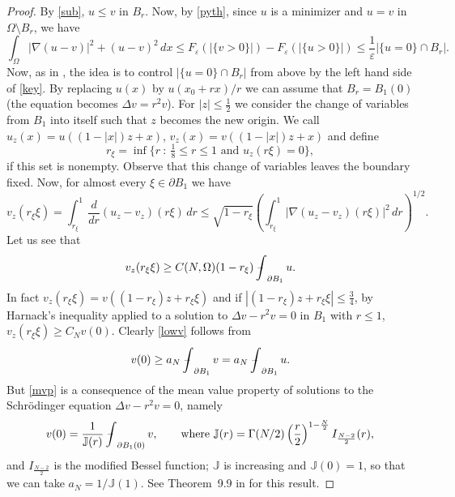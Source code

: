 \documentclass[11pt]{amsart}
\theoremstyle{definition}
\theoremstyle{remark}
\numberwithin{equation}{section}
\newcommand{\avint}{\mathop{\,\rlap{--}\!\!\int}\nolimits}
\begin{document}
\begin{proof}
By \eqref{sub}, $u\le v$ in $B_r$. Now, by \eqref{pyth}, since $u$ is a minimizer and $u=v$ in $\Omega\setminus B_r$, we have
\begin{equation}\label{key}
\int_\Omega|\nabla(u-v)|^2+(u-v)^2\,dx\le F_\varepsilon(|\{v>0\}|)-F_\varepsilon(|\{u>0\}|)\le\frac1\varepsilon|\{u=0\}\cap B_r|.
\end{equation}
Now, as in \cite{AC}, the idea is to control $|\{u=0\}\cap B_r|$ from above by the left hand side of \eqref{key}. By replacing $u(x)$ by $u(x_0+rx)/r$ we can assume that $B_r=B_1(0)$ (the equation becomes $\Delta v=r^2v$). For $|z|\le\frac12$ we consider the change of variables from $B_1$ into itself such that $z$ becomes the new origin. We call $u_z(x)=u((1-|x|)z+x)$, $v_z(x)=v((1-|x|)z+x)$ and define
\[
r_\xi=\inf\{r\ :\ \tfrac18\le r\le1\text{ and }u_z(r\xi)=0\},
\]
if this set is nonempty. Observe that this change of variables leaves the boundary fixed. Now, for almost every $\xi\in\partial B_1$ we have
\begin{equation}\label{fund}
v_z(r_\xi\xi)=\int_{r_\xi}^1\frac{d}{dr}(u_z-v_z)(r\xi)\,dr\le\sqrt{1-r_\xi}\left(\int_{r_\xi}^1|\nabla(u_z-v_z)(r\xi)|^2\,dr\right)^{1/2}.
\end{equation}
Let us see that
\begin{equation}\label{lowv}
v_z(r_\xi\xi)\ge C(N,\Omega)(1-r_\xi)\avint_{\partial B_1}u.
\end{equation}
In fact $v_z(r_\xi\xi)=v((1-r_\xi)z+r_\xi\xi)$ and if $|(1-r_\xi)z+r_\xi\xi|\le\frac34$, by Harnack's inequality applied to a solution to $\Delta v-r^2v=0$ in $B_1$ with $r\le1$, $v_z(r_\xi\xi)\ge C_Nv(0)$. Clearly \eqref{lowv} follows from
\begin{equation}\label{mvp}
v(0)\ge a_N\avint_{\partial B_1}v=a_N\avint_{\partial B_1}u.
\end{equation}
But \eqref{mvp} is a consequence of the mean value property of solutions to the Schrödinger equation $\Delta v-r^2v=0$, namely
\[
v(0)=\frac1{\mathbb{J}(r)}\avint_{\partial B_1(0)}v,\qquad\text{where }\mathbb{J}(r)=\Gamma(N/2)\left(\frac r2\right)^{1-\frac N2}I_{\frac{N-2}2}(r),
\]
and $I_{\frac{N-2}2}$ is the modified Bessel function; $\mathbb{J}$ is increasing and $\mathbb{J}(0)=1$, so that we can take $a_N=1/\mathbb{J}(1)$. See Theorem~9.9 in \cite{LL} for this result.


\end{proof}
\end{document}
